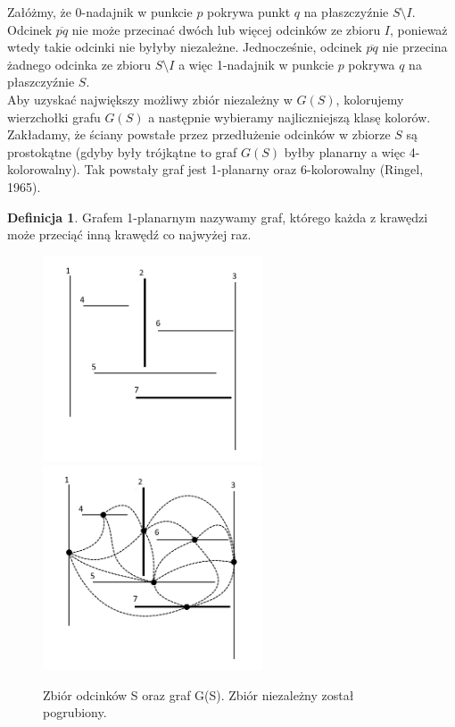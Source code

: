 \documentclass[brudnopis]{xmgr}
\theoremstyle{definition}
\newtheorem{Definicja}{Definicja}
\begin{document}
\indent Załóżmy, że 0-nadajnik w punkcie $p$ pokrywa punkt $q$ na płaszczyźnie $S \setminus I$. Odcinek $\overline{pq}$ nie może przecinać dwóch lub więcej odcinków ze zbioru $I$, ponieważ wtedy takie odcinki nie byłyby niezależne. Jednocześnie, odcinek $\overline{pq}$ nie przecina żadnego odcinka ze zbioru $S \setminus I$ a więc 1-nadajnik w punkcie $p$ pokrywa $q$ na płaszczyźnie $S$.
\\\indent Aby uzyskać największy możliwy zbiór niezależny w $G(S)$, kolorujemy wierzchołki grafu $G(S)$ a następnie wybieramy najliczniejszą klasę kolorów. Zakładamy, że ściany powstałe przez przedłużenie odcinków w zbiorze $S$ są prostokątne (gdyby były trójkątne to graf $G(S)$ byłby planarny a więc 4-kolorowalny). 
Tak powstały graf jest 1-planarny oraz 6-kolorowalny (Ringel, 1965).

\begin{Definicja}
  Grafem 1-planarnym nazywamy graf, którego każda z krawędzi może przeciąć inną krawędź co najwyżej raz.
\end{Definicja}
\begin{figure}[ht!]
  \centering
  \includegraphics[width=6.5cm]{rysunki/zbior_odcinkow.png}
  \includegraphics[width=6.5cm]{rysunki/graf_zbioru_odcinkow.png}
  \caption{Zbiór odcinków S oraz graf G(S). Zbiór niezależny został pogrubiony.}
  \label{fig:przedluzone odcinki}
\end{figure} 
\end{document}
